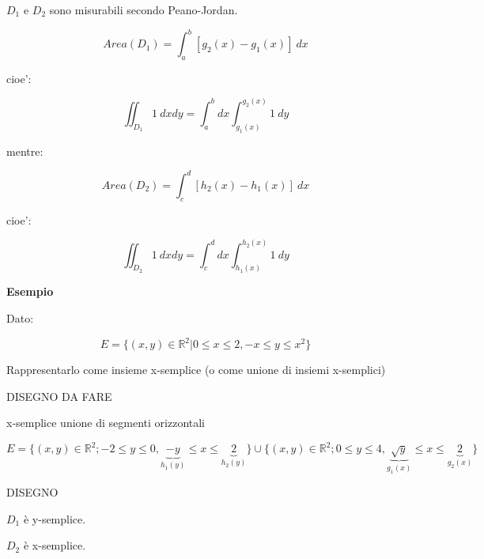 \documentclass[../appunti-analisi.tex]{subfiles}
\begin{document}
$D_1$ e $D_2$ sono misurabili secondo Peano-Jordan.

\[
    Area(D_1) = \int_{a}^{b} {[g_2(x) -g_1(x)]} \: dx 
\]

cioe':

\[
    \iint_{D_1} {1} \: d x d y = \int_{a}^{b} {dx \int_{g_1(x)}^{g_2(x)} {1} \: d y }
\]

mentre:

\[
    Area(D_2) = \int_{c}^{d} {[h_2(x) -h_1(x)]} \: dx 
\]

cioe':

\[
    \iint_{D_2} {1} \: d x d y = \int_{c}^{d} {dx \int_{h_1(x)}^{h_2(x)} {1} \: d y }
\]



\textbf{Esempio} 

Dato:

\[
    E = \{(x,y) \in \mathbb{R}^{2}| 0 \le x \le 2, -x \le y \le x^{2}\}
\]

Rappresentarlo come insieme x-semplice (o come unione di insiemi x-semplici)


DISEGNO DA FARE


x-semplice unione di segmenti orizzontali

\[
    E = \{(x,y) \in \mathbb{R}^{2}; -2 \le y \le 0, \underbrace{-y}_\text{$h_1(y)$} \le x \le \underbrace{2}_\text{$h_2(y)$}\} \cup \{(x,y) \in \mathbb{R}^{2}; 0 \le y \le 4, \underbrace{\sqrt{y}}_\text{$g_1(x)$} \le  x \le \underbrace{2}_\text{$g_2(x)$}\}
\]


DISEGNO

$D_1$ è y-semplice.

$D_2$ è x-semplice.
\end{document}

